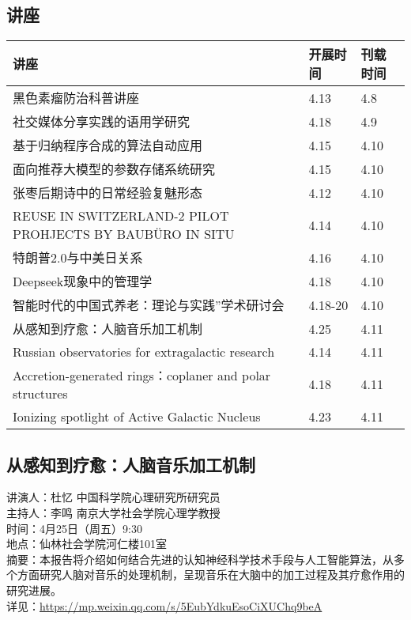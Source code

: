 \documentclass[letterpaper, 12pt]{article}
\begin{document}
\begin{multicols}{2}
\pagebreak

\section{讲座}
\begin{tabular}{|>{\centering\arraybackslash}m{}|m{}|m{}|}
    \hline
    讲座 & 开展时间 & 刊载时间\\
    \hline\hline
    黑色素瘤防治科普讲座 & 4.13 & 4.8\\\hline
    社交媒体分享实践的语用学研究 & 4.18 & 4.9\\\hline
    基于归纳程序合成的算法自动应用 & 4.15 & 4.10\\\hline
    面向推荐大模型的参数存储系统研究 & 4.15 & 4.10\\\hline
    张枣后期诗中的日常经验复魅形态 & 4.12 & 4.10\\\hline
    REUSE IN SWITZERLAND-2 PILOT PROHJECTS BY BAUBÜRO IN SITU & 4.14 & 4.10\\\hline
    特朗普2.0与中美日关系 & 4.16 & 4.10\\\hline
    Deepseek现象中的管理学 & 4.18 & 4.10\\\hline
    智能时代的中国式养老：理论与实践”学术研讨会 & 4.18-20 & 4.10\\\hline
    从感知到疗愈：人脑音乐加工机制 & 4.25 & 4.11\\\hline
    Russian observatories for extragalactic research & 4.14 & 4.11\\\hline
    Accretion-generated rings：coplaner and polar structures & 4.18 & 4.11\\\hline
    Ionizing spotlight of Active Galactic Nucleus & 4.23 & 4.11\\\hline
\end{tabular}
\subsection{从感知到疗愈：人脑音乐加工机制}
讲演人：杜忆 中国科学院心理研究所研究员
\\主持人：李鸣 南京大学社会学院心理学教授
\\时间：4月25日（周五）9:30
\\地点：仙林社会学院河仁楼101室
\\摘要：本报告将介绍如何结合先进的认知神经科学技术手段与人工智能算法，从多个方面研究人脑对音乐的处理机制，呈现音乐在大脑中的加工过程及其疗愈作用的研究进展。
\\详见：\url{https://mp.weixin.qq.com/s/5EubYdkuEsoCiXUChq9beA}



\end{multicols}
\end{document}
